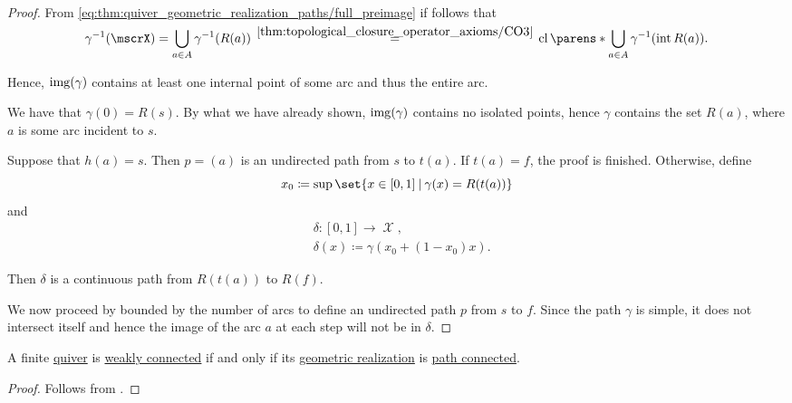 \begin{proof}
   From \eqref{eq:thm:quiver_geometric_realization_paths/full_preimage} if follows that
  \begin{equation*}
    \gamma^{-1}(\mscrX)
    =
    \bigcup_{a \in A} \gamma^{-1}(R(a))
    \reloset{\ref{thm:topological_closure_operator_axioms/CO3}} =
    \cl\parens*{ \bigcup_{a \in A} \gamma^{-1}(\Int R(a)) }.
  \end{equation*}

  Hence, \( \operatorname{img}(\gamma) \) contains at least one internal point of some arc and thus the entire arc.

   We have that \( \gamma(0) = R(s) \). By what we have already shown, \( \operatorname{img}(\gamma) \) contains no isolated points, hence \( \gamma \) contains the set \( R(a) \), where \( a \) is some arc incident to \( s \).

  Suppose that \( h(a) = s \). Then \( p = (a) \) is an undirected path from \( s \) to \( t(a) \). If \( t(a) = f \), the proof is finished. Otherwise, define
  \begin{equation*}
    x_0 \coloneqq \sup\set{ x \in [0, 1] \given \gamma(x) = R(t(a)) }
  \end{equation*}
  and
  \begin{equation*}
    \begin{aligned}
      &\delta: [0, 1] \to \mscrX, \\
      &\delta(x) \coloneqq \gamma(x_0 + (1 - x_0) x).
    \end{aligned}
  \end{equation*}

  Then \( \delta \) is a continuous path from \( R(t(a)) \) to \( R(f) \).

  We now proceed by  bounded by the number of arcs to define an undirected path \( p \) from \( s \) to \( f \). Since the path \( \gamma \) is simple, it does not intersect itself and hence the image of the arc \( a \) at each step will not be in \( \delta \).
\end{proof}

\begin{corollary}\label{thm:quiver_geometric_realization_connectedness}
  A finite \hyperref[def:quiver]{quiver} is \hyperref[def:quiver_connectedness/weak]{weakly connected} if and only if its \hyperref[def:quiver_geometric_realization/undirected]{geometric realization} is \hyperref[def:path_connected]{path connected}.
\end{corollary}
\begin{proof}
  Follows from .
\end{proof}

